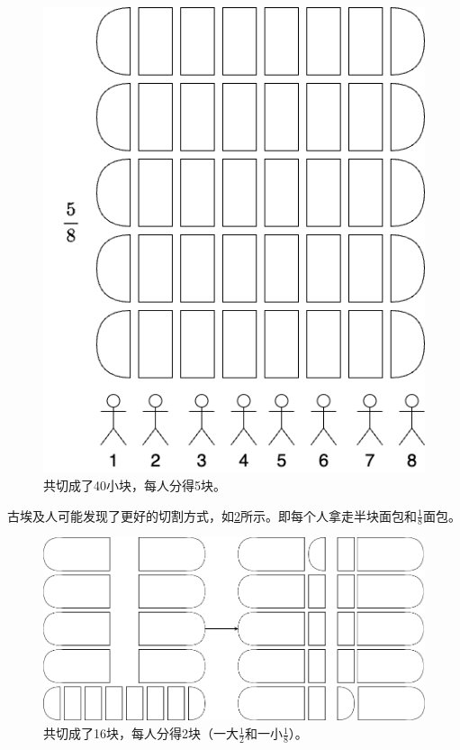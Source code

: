 \documentclass[b5paper]{ctexart}
\begin{document}
\begin{figure}[htbp]
 \centering
 \includegraphics[scale=0.3]{img/evenly-divide}
 \caption{共切成了40小块，每人分得5块。}
 \label{fig:evenly-devide}
\end{figure}

古埃及人可能发现了更好的切割方式，如\cref{fig:egyptian-devide}所示。即每个人拿走半块面包和$\frac{1}{8}$面包。

\begin{figure}[htbp]
 \centering
 \includegraphics[scale=0.3]{img/egyptian-divide}
 \caption{共切成了16块，每人分得2块（一大$\frac{1}{2}$和一小$\frac{1}{8}$）。}
 \label{fig:egyptian-devide}
\end{figure}
\end{document}
